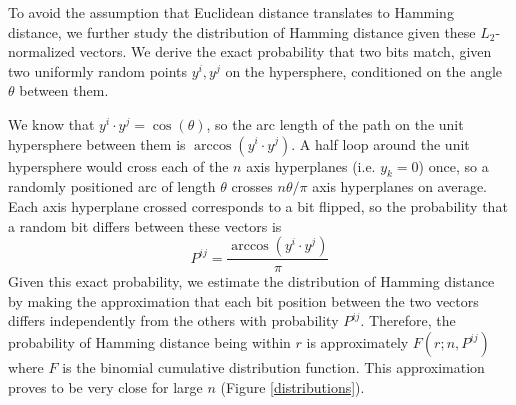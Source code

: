 \documentclass{article}
\renewenvironment{figure}{\par\medskip\noindent\minipage{\linewidth}}{\endminipage\par\medskip}
\begin{document}
\begin{multicols}{2}
To avoid the assumption that Euclidean distance translates to Hamming distance, we further study the distribution of Hamming distance given these $L_2$-normalized vectors.
We derive the exact probability that two bits match, given two uniformly random points $y^i, y^j$ on the hypersphere, conditioned on the angle $\theta$ between them.

We know that $y^i \cdot y^j = \cos(\theta)$, so the arc length of the path on the unit hypersphere between them is $\arccos(y^i \cdot y^j)$.
A half loop around the unit hypersphere would cross each of the $n$ axis hyperplanes (i.e. $y_k = 0$) once, so a randomly positioned arc of length $\theta$ crosses $n \theta / \pi$ axis hyperplanes on average.
Each axis hyperplane crossed corresponds to a bit flipped, so the probability that a random bit differs between these vectors is
\[P^{ij} = \frac{\arccos\left(y^i \cdot y^j\right)}{\pi}\]
Given this exact probability, we estimate the distribution of Hamming distance by making the approximation that each bit position between the two vectors differs independently from the others with probability $P^{ij}$.
Therefore, the probability of Hamming distance being within $r$ is approximately $F(r; n, P^{ij})$ where $F$ is the binomial cumulative distribution function.
This approximation proves to be very close for large $n$ (Figure \ref{distributions}).

\begin{figure}
\begin{center}
\end{center}
\end{figure}
\end{multicols}
\end{document}
